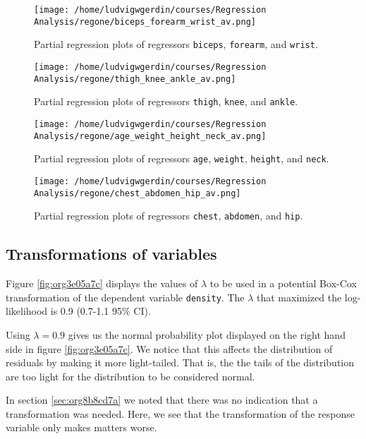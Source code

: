 \documentclass[11pt]{article}
\begin{document}
\begin{figure}[htbp]
\centering
\texttt{[image: /home/ludvigwgerdin/courses/Regression Analysis/regone/biceps\_forearm\_wrist\_av.png]}
\caption{\label{fig:org291f455}
Partial regression plots of regressors \texttt{biceps}, \texttt{forearm}, and \texttt{wrist}.}
\end{figure}   

\begin{figure}[htbp]
\centering
\texttt{[image: /home/ludvigwgerdin/courses/Regression Analysis/regone/thigh\_knee\_ankle\_av.png]}
\caption{\label{fig:org0cf37f0}
Partial regression plots of regressors \texttt{thigh}, \texttt{knee}, and \texttt{ankle}.}
\end{figure}

\begin{figure}[htbp]
\centering
\texttt{[image: /home/ludvigwgerdin/courses/Regression Analysis/regone/age\_weight\_height\_neck\_av.png]}
\caption{\label{fig:org6a256be}
Partial regression plots of regressors \texttt{age}, \texttt{weight}, \texttt{height}, and \texttt{neck}.}
\end{figure}

\begin{figure}[htbp]
\centering
\texttt{[image: /home/ludvigwgerdin/courses/Regression Analysis/regone/chest\_abdomen\_hip\_av.png]}
\caption{\label{fig:orgab9b471}
Partial regression plots of regressors \texttt{chest}, \texttt{abdomen}, and \texttt{hip}.}
\end{figure}
\subsection{Transformations of variables}
\label{sec:orgab56f76}

Figure \ref{fig:org3e05a7c} displays the values of \(\lambda\) to be used in a potential Box-Cox transformation of 
the dependent variable \texttt{density}. The \(\lambda\) that maximized the log-likelihood is 0.9 (0.7-1.1 95\% CI). 

Using \(\lambda = 0.9\) gives us the normal probability plot displayed on the right hand side in figure \ref{fig:org3e05a7c}.
We notice that this affects the distribution of residuals by making it more light-tailed. That is, the 
the tails of the distribution are too light for the distribution to be considered normal.

In section \ref{sec:org8b8cd7a} we noted that there was no indication that a transformation was needed. 
Here, we see that the transformation of the response variable only makes matters worse.
\end{document}
